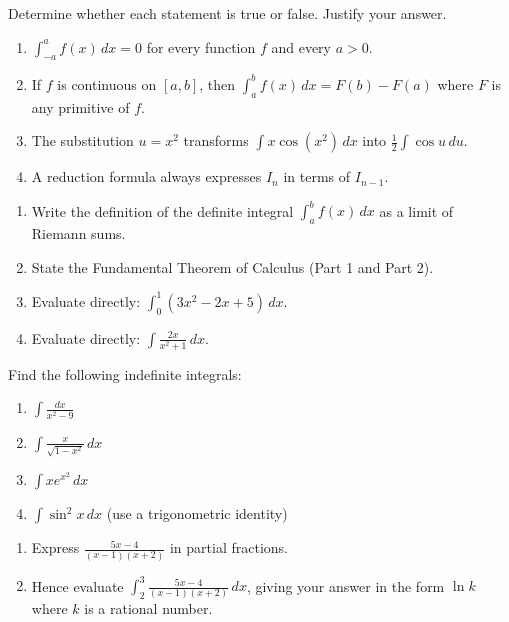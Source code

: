 \documentclass[11pt]{article}
\newcounter{popsec}
\newcounter{popsub}
\newcommand{\courssub}[1]{%
  \stepcounter{popsub}%
  \par\vspace{9pt}\noindent{\popxbold\fontsize{11.5}{13}\selectfont\color{popink}{\color{poporange}\thepopsec.\thepopsub}\hspace{6pt}#1}\par\nopagebreak\vspace{4pt}
}
\begin{document}
\begin{exercice}
Determine whether each statement is true or false. Justify your answer.
\begin{enumerate}
\item $\displaystyle\int_{-a}^{a} f(x)\,dx = 0$ for every function $f$ and every $a>0$.
\item If $f$ is continuous on $[a,b]$, then $\displaystyle\int_a^b f(x)\,dx = F(b)-F(a)$ where $F$ is any primitive of $f$.
\item The substitution $u = x^2$ transforms $\displaystyle\int x\cos(x^2)\,dx$ into $\displaystyle\frac12\int \cos u\,du$.
\item A reduction formula always expresses $I_n$ in terms of $I_{n-1}$.
\end{enumerate}
\end{exercice}

\begin{exercice}
\begin{enumerate}
\item Write the definition of the definite integral $\displaystyle\int_a^b f(x)\,dx$ as a limit of Riemann sums.
\item State the Fundamental Theorem of Calculus (Part 1 and Part 2).
\item Evaluate directly: $\displaystyle\int_0^1 (3x^2 - 2x + 5)\,dx$.
\item Evaluate directly: $\displaystyle\int \frac{2x}{x^2+1}\,dx$.
\end{enumerate}
\end{exercice}

\begin{exercice}
Find the following indefinite integrals:
\begin{enumerate}
\item $\displaystyle\int \frac{dx}{x^2-9}$
\item $\displaystyle\int \frac{x}{\sqrt{1-x^2}}\,dx$
\item $\displaystyle\int x e^{x^2}\,dx$
\item $\displaystyle\int \sin^2 x\,dx$ (use a trigonometric identity)
\end{enumerate}
\end{exercice}

\courssub{I practise}

\begin{exercice}
\begin{enumerate}
\item Express $\displaystyle\frac{5x-4}{(x-1)(x+2)}$ in partial fractions.
\item Hence evaluate $\displaystyle\int_2^3 \frac{5x-4}{(x-1)(x+2)}\,dx$, giving your answer in the form $\ln k$ where $k$ is a rational number.
\end{enumerate}
\end{exercice}
\end{document}
